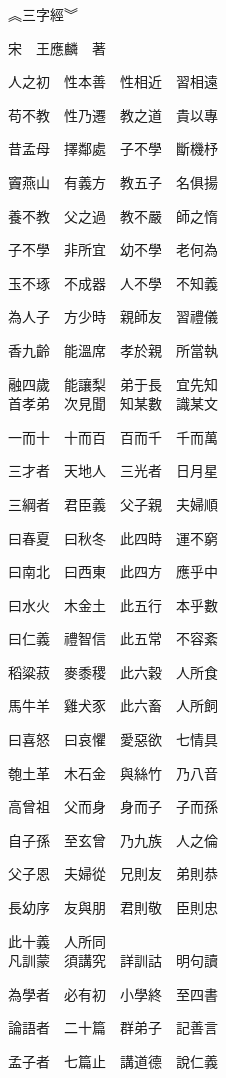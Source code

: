 \documentclass[a4paper,twocolumn]{article}
\begin{document}
\begin{Huge}
︽三字經︾

宋　王應麟　著
\\

\end{Huge}
\begin{Large}
人之初　性本善　性相近　習相遠　

苟不教　性乃遷　教之道　貴以專　

昔孟母　擇鄰處　子不學　斷機杼　

竇燕山　有義方　教五子　名俱揚　

養不教　父之過　教不嚴　師之惰　

子不學　非所宜　幼不學　老何為　

玉不琢　不成器　人不學　不知義　

為人子　方少時　親師友　習禮儀　

香九齡　能溫席　孝於親　所當執　

融四歲　能讓梨　弟于長　宜先知　
\\

首孝弟　次見聞　知某數　識某文　

一而十　十而百　百而千　千而萬　

三才者　天地人　三光者　日月星　

三綱者　君臣義　父子親　夫婦順　

曰春夏　曰秋冬　此四時　運不窮　

曰南北　曰西東　此四方　應乎中　

曰水火　木金土　此五行　本乎數　

曰仁義　禮智信　此五常　不容紊　

稻粱菽　麥黍稷　此六穀　人所食　

馬牛羊　雞犬豕　此六畜　人所飼　

曰喜怒　曰哀懼　愛惡欲　七情具　

匏土革　木石金　與絲竹　乃八音　

高曾祖　父而身　身而子　子而孫　

自子孫　至玄曾　乃九族　人之倫　

父子恩　夫婦從　兄則友　弟則恭　

長幼序　友與朋　君則敬　臣則忠　

此十義　人所同　
\\

凡訓蒙　須講究　詳訓詁　明句讀　

為學者　必有初　小學終　至四書　

論語者　二十篇　群弟子　記善言　

孟子者　七篇止　講道德　說仁義　


\end{Large}
\end{document}
